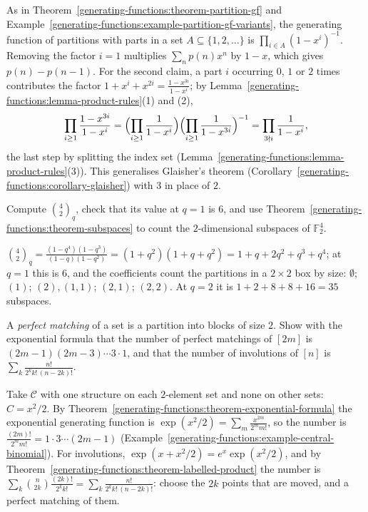 \begin{solution}
As in Theorem~\ref{generating-functions:theorem-partition-gf} and Example~\ref{generating-functions:example-partition-gf-variants}, the generating function of partitions with parts in a set
$A \subseteq \{1, 2, \ldots\}$ is $\prod_{i \in A}(1 - x^i)^{-1}$.
Removing the factor $i = 1$ multiplies $\sum_np(n)x^n$ by $1 - x$, which gives $p(n) - p(n - 1)$. For the second claim, a part $i$ occurring $0$, $1$ or $2$ times contributes the factor
$1 + x^i + x^{2i} = \frac{1 - x^{3i}}{1 - x^i}$; by Lemma~\ref{generating-functions:lemma-product-rules}(1) and (2),
\[
\prod_{i \geq 1}\frac{1 - x^{3i}}{1 - x^i} = \Bigl(\prod_{i \geq 1}\frac{1}{1 - x^i}\Bigr)\Bigl(\prod_{i \geq 1}\frac{1}{1 - x^{3i}}\Bigr)^{-1} = \prod_{3 \nmid i}\frac{1}{1 - x^i},
\]
the last step by splitting the index set (Lemma~\ref{generating-functions:lemma-product-rules}(3)). This generalises Glaisher's theorem (Corollary~\ref{generating-functions:corollary-glaisher}) with $3$ in place of $2$.
\end{solution}

\begin{exercise}\label{generating-functions:exercise-q-binomial-values}
Compute $\binom{4}{2}_q$, check that its value at $q = 1$ is $6$, and use Theorem~\ref{generating-functions:theorem-subspaces} to count the $2$-dimensional subspaces of $\mathbb{F}_2^4$.
\end{exercise}

\begin{solution}
$\binom{4}{2}_q = \frac{(1 - q^4)(1 - q^3)}{(1 - q)(1 - q^2)} = (1 + q^2)(1 + q + q^2) = 1 + q + 2q^2 + q^3 + q^4$; at $q = 1$ this is $6$, and the coefficients count the partitions in a $2 \times 2$
box by size: $\emptyset$; $(1)$; $(2), (1, 1)$; $(2, 1)$; $(2, 2)$. At $q = 2$ it is $1 + 2 + 8 + 8 + 16 = 35$ subspaces.
\end{solution}

\begin{exercise}\label{generating-functions:exercise-matchings}
A \emph{perfect matching} of a set is a partition into blocks of size $2$. Show with the exponential formula that the number of perfect matchings of $[2m]$ is $(2m - 1)(2m - 3) \cdots 3 \cdot 1$, and
that the number of involutions of $[n]$ is $\sum_k\frac{n!}{2^kk!\,(n - 2k)!}$.
\end{exercise}

\begin{solution}
Take $\mathcal{C}$ with one structure on each $2$-element set and none on other sets: $C = x^2/2$. By Theorem~\ref{generating-functions:theorem-exponential-formula} the exponential generating function is
$\exp(x^2/2) = \sum_m\frac{x^{2m}}{2^mm!}$, so the number is $\frac{(2m)!}{2^mm!} = 1 \cdot 3 \cdots (2m - 1)$ (Example~\ref{generating-functions:example-central-binomial}). For involutions,
$\exp(x + x^2/2) = e^x\exp(x^2/2)$, and by Theorem~\ref{generating-functions:theorem-labelled-product} the number is $\sum_k\binom{n}{2k}\frac{(2k)!}{2^kk!} = \sum_k\frac{n!}{2^kk!\,(n - 2k)!}$:
choose the $2k$ points that are moved, and a perfect matching of them.
\end{solution}

